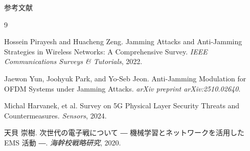 \documentclass[11pt, aspectratio=169]{beamer}
\begin{document}
\begin{frame}[allowframebreaks]{参考文献}
  \begin{thebibliography}{9}
    
      Hossein Pirayesh and Huacheng Zeng.
      \newblock Jamming Attacks and Anti-Jamming Strategies in Wireless Networks: A Comprehensive Survey.
      \newblock \emph{IEEE Communications Surveys \& Tutorials}, 2022.

      Jaewon Yun, Joohyuk Park, and Yo-Seb Jeon.
      \newblock Anti-Jamming Modulation for OFDM Systems under Jamming Attacks.
      \newblock \emph{arXiv preprint arXiv:2510.02640}.

      Michal Harvanek, et al.
      \newblock Survey on 5G Physical Layer Security Threats and Countermeasures.
      \newblock \emph{Sensors}, 2024.
      
      天貝 崇樹.
      \newblock 次世代の電子戦について ― 機械学習とネットワークを活用した EMS 活動 ―.
      \newblock \emph{海幹校戦略研究}, 2020.

  \end{thebibliography}
\end{frame}
\end{document}
